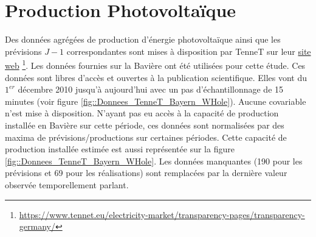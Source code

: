 \documentclass[12pt]{report}
\begin{document}
\section{Production Photovoltaïque}
Des données agrégées de production d'énergie photovoltaïque ainsi que les prévisions $J-1$ correspondantes sont mises à disposition par TenneT sur leur \href{https://www.tennet.eu/electricity-market/transparency-pages/transparency-germany/}{site web} \footnote{\url{https://www.tennet.eu/electricity-market/transparency-pages/transparency-germany/}}. Les données fournies sur la Bavière ont été utilisées pour cette étude. Ces données sont libres d'accès et ouvertes à la publication scientifique. Elles vont du $1^{er}$ décembre 2010 jusqu'à aujourd'hui avec un pas d'échantillonnage de 15 minutes (voir figure \ref{fig::Donnees_TenneT_Bayern_WHole}). Aucune covariable n'est mise à disposition. N'ayant pas eu accès à la capacité de production installée en Bavière sur cette période, ces données sont normalisées par des maxima de prévisions/productions sur certaines périodes. Cette capacité de production installée estimée est aussi représentée sur la figure \ref{fig::Donnees_TenneT_Bayern_WHole}. Les données manquantes (190 pour les prévisions et 69 pour les réalisations) sont remplacées par la dernière valeur observée temporellement parlant. 
\end{document}
